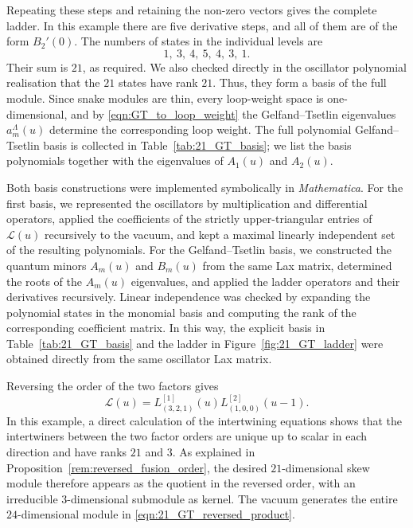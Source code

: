\documentclass[12pt,reqno]{amsart}
\numberwithin{equation}{section}
\begin{document}
Repeating these steps and retaining the non-zero vectors gives the complete ladder. In this example there are five derivative steps, and all of them are of the form $B_2'(0)$. The numbers of states in the individual levels are
\begin{equation}
	1,\ 3,\ 4,\ 5,\ 4,\ 3,\ 1.
	\label{eqn:21_GT_level_dimensions}
\end{equation}
Their sum is $21$, as required. We also checked directly in the oscillator polynomial realisation that the $21$ states have rank $21$. Thus, they form a basis of the full module. Since snake modules are thin, every loop-weight space is one-dimensional, and by \eqref{eqn:GT_to_loop_weight} the Gelfand--Tsetlin eigenvalues $a_m^\Lambda(u)$ determine the corresponding loop weight. The full polynomial Gelfand--Tsetlin basis is collected in Table~\ref{tab:21_GT_basis}; we list the basis polynomials together with the eigenvalues of $A_1(u)$ and $A_2(u)$.

Both basis constructions were implemented symbolically in \textit{Mathematica}. For the first basis, we represented the oscillators by multiplication and differential operators, applied the coefficients of the strictly upper-triangular entries of $\mathcal{L}(u)$ recursively to the vacuum, and kept a maximal linearly independent set of the resulting polynomials. For the Gelfand--Tsetlin basis, we constructed the quantum minors $A_m(u)$ and $B_m(u)$ from the same Lax matrix, determined the roots of the $A_m(u)$ eigenvalues, and applied the ladder operators and their derivatives recursively. Linear independence was checked by expanding the polynomial states in the monomial basis and computing the rank of the corresponding coefficient matrix. In this way, the explicit basis in Table~\ref{tab:21_GT_basis} and the ladder in Figure~\ref{fig:21_GT_ladder} were obtained directly from the same oscillator Lax matrix.

Reversing the order of the two factors gives
\begin{equation}
 \mathcal{L}(u)= L^{[1]}_{(3,2,1)}(u)L^{[2]}_{(1,0,0)}(u-1).
 \label{eqn:21_GT_reversed_product}
\end{equation}
In this example, a direct calculation of the intertwining equations
shows that the intertwiners between the two factor orders are unique
up to scalar in each direction and have ranks $21$ and $3$.
As explained in Proposition~\ref{rem:reversed_fusion_order}, the desired
$21$-dimensional skew module therefore appears as the quotient
in the reversed order, with an irreducible $3$-dimensional
submodule as kernel. The vacuum generates the entire
$24$-dimensional module in \eqref{eqn:21_GT_reversed_product}.
\end{document}
